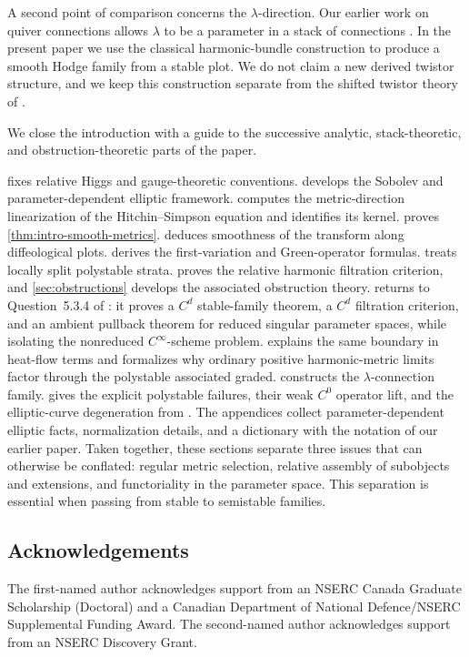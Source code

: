 \documentclass[11pt,reqno]{amsart}
\theoremstyle{definition}
\theoremstyle{remark}
\begin{document}
A second point of comparison concerns the $\lambda$-direction.  Our earlier work on quiver connections allows $\lambda$ to be a parameter in a stack of connections \cite{AzamRayan2025}.  In the present paper we use the classical harmonic-bundle construction to produce a smooth Hodge family from a stable plot.  We do not claim a new derived twistor structure, and we keep this construction separate from the shifted twistor theory of \cite{KryczkaTanakaYau2026}.


We close the introduction with a guide to the successive analytic, stack-theoretic, and obstruction-theoretic parts of the paper.


 fixes relative Higgs and gauge-theoretic conventions.   develops the Sobolev and parameter-dependent elliptic framework.   computes the metric-direction linearization of the Hitchin--Simpson equation and identifies its kernel.   proves \cref{thm:intro-smooth-metrics}.   deduces smoothness of the transform along diffeological plots.   derives the first-variation and Green-operator formulas.   treats locally split polystable strata.   proves the relative harmonic filtration criterion, and \cref{sec:obstructions} develops the associated obstruction theory.   returns to Question~5.3.4 of \cite{AzamRayan2026}: it proves a $C^d$ stable-family theorem, a $C^d$ filtration criterion, and an ambient pullback theorem for reduced singular parameter spaces, while isolating the nonreduced $C^\infty$-scheme problem.   explains the same boundary in heat-flow terms and formalizes why ordinary positive harmonic-metric limits factor through the polystable associated graded.   constructs the $\lambda$-connection family.   gives the explicit polystable failures, their weak $C^0$ operator lift, and the elliptic-curve degeneration from \cite{Simpson1994,AzamRayan2026}.  The appendices collect parameter-dependent elliptic facts, normalization details, and a dictionary with the notation of our earlier paper.  Taken together, these sections separate three issues that can otherwise be conflated: regular metric selection, relative assembly of subobjects and extensions, and functoriality in the parameter space.  This separation is essential when passing from stable to semistable families.

\subsection*{Acknowledgements}
The first-named author acknowledges support from an NSERC Canada Graduate Scholarship (Doctoral) and a Canadian Department of National Defence/NSERC Supplemental Funding Award.  The second-named author acknowledges support from an NSERC Discovery Grant.
\end{document}
